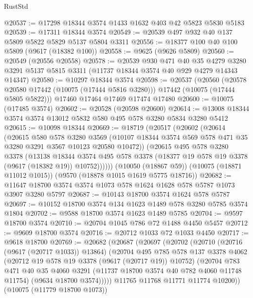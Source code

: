 \begin{lexlean}{RustStd}
\begin{coremodule}
@20537 := @17298 @18344 @3574 @1433 @1632 @403 @42 @5823 @5830 @5183
@20539 := @17311 @18344 @3574
@20549 := @20539 @497 @932 @40 @137 @5809 @5822 @5829 @5137 @5804 @3311
@20556 := @18377 @100 @40 @100 @5809 (@9617 (@18382 @100))
@20558 := @9625 (@9626 @5809)
@20560 := @20549 (@20556 @20558)
@20578 := @20539
    @930
    @471
    @40
    @35
    @4279
    @3280
    @3291
    @5137
    @5815
    @3311
    (@11737 @18344 @3574 @40 @929 @4279 @14343 @14347)
@20580 := @10297 @18344 @3574
@20598 := @20537
    (@20560
      (@20578 @20580 @17442 (@10075 (@17444 @5816 @3280)))
      @17442
      (@10075 (@17444 @5805 @5822)))
    @17460
    @17464
    @17469
    @17474
    @17480
@20600 := @10075 (@17485 @3574)
@20602 := @20528 (@20598 @20600)
@20614 := @13008 @18344 @3574 @3574 @13012 @5832 @580 @495 @578 @3280 @5834 @3280 @5412
@20615 := @10098 @18344
@20669 := @18719
    (@20517
      (@20602
        (@20614
          (@20615
            @580
            @578
            @3280
            @3569
            (@10107 @18344 @3574 @569 @578 @471 @35 @3280 @3291 @3567 @10123 @20580 @10472))
          (@20615
            @495
            @578
            @3280
            @3378
            (@13138
              @18344
              @3574
              @495
              @578
              @3378
              (@18377 @19 @578 @19 @3378 (@9617 (@18382 @19)) @10752))))))
    (@10050 (@18867 @59))
    (@10075 (@18871 @11012 @1015))
    (@9570 (@18878 @1015 @1619 @5775 @18716))
@20682 := @11647 @18700 @3574 @3574 @1073 @578 @1624 @1628 @578 @5787 @1073 @3907 @3280 @5797
@20687 := @10143 @18700 @3574 @1624 @578 @5787
@20697 := @10152 @18700 @3574 @134 @1623 @1489 @578 @3280 @5785 @3574 @1804
@20702 := @9588 @18700 @3574 @1623 @1489 @5785
@20704 := @9597 @18700 @3574
@20710 := @20704 @1045 @786 @72 @1488 @4450 @5457
@20712 := @9609 @18700 @3574
@20716 := @20712 @1033 @72 @1033 @4450
@20717 := @9618 @18700
@20769 := @20682
    (@20687
      (@20697
        (@20702
          (@20710
            (@20716 (@9617 (@20717 @1033)) @13864)
            (@20704
              @495
              @785
              @578
              @137
              @3378
              @4062
              (@20712 @19 @578 @19 @3378 (@9617 (@20717 @19)) @10752)
              (@20704
                @783
                @471
                @40
                @35
                @4060
                @3291
                (@11737 @18700 @3574 @40 @782 @4060 @11748 @11754)
                (@9634 @18700 @3574)))))
        @11765
        @11768
        @11771
        @11774
        @10200))
    (@10075 (@11779 @18700 @1073))

\end{coremodule}
\end{lexlean}
